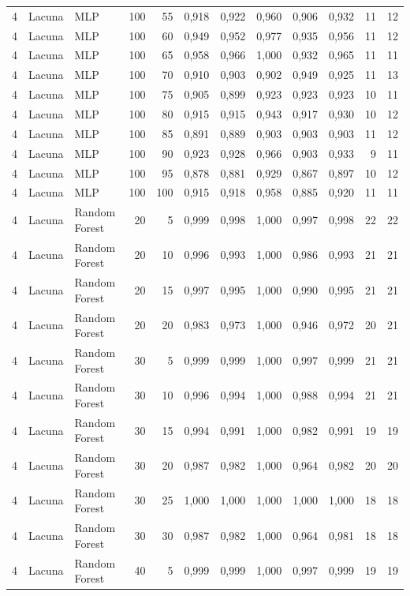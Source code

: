 \begin{longtable}{@{}rllrrrrrrrrr@{}}
4 & Lacuna & MLP & 100 & 55 & 0,918 & 0,922 & 0,960 & 0,906 & 0,932 & 11 & 12 \\
4 & Lacuna & MLP & 100 & 60 & 0,949 & 0,952 & 0,977 & 0,935 & 0,956 & 11 & 12 \\
4 & Lacuna & MLP & 100 & 65 & 0,958 & 0,966 & 1,000 & 0,932 & 0,965 & 11 & 11 \\
4 & Lacuna & MLP & 100 & 70 & 0,910 & 0,903 & 0,902 & 0,949 & 0,925 & 11 & 13 \\
4 & Lacuna & MLP & 100 & 75 & 0,905 & 0,899 & 0,923 & 0,923 & 0,923 & 10 & 11 \\
4 & Lacuna & MLP & 100 & 80 & 0,915 & 0,915 & 0,943 & 0,917 & 0,930 & 10 & 12 \\
4 & Lacuna & MLP & 100 & 85 & 0,891 & 0,889 & 0,903 & 0,903 & 0,903 & 11 & 12 \\
4 & Lacuna & MLP & 100 & 90 & 0,923 & 0,928 & 0,966 & 0,903 & 0,933 & 9 & 11 \\
4 & Lacuna & MLP & 100 & 95 & 0,878 & 0,881 & 0,929 & 0,867 & 0,897 & 10 & 12 \\
4 & Lacuna & MLP & 100 & 100 & 0,915 & 0,918 & 0,958 & 0,885 & 0,920 & 11 & 11 \\
4 & Lacuna & Random Forest & 20 & 5 & 0,999 & 0,998 & 1,000 & 0,997 & 0,998 & 22 & 22 \\
4 & Lacuna & Random Forest & 20 & 10 & 0,996 & 0,993 & 1,000 & 0,986 & 0,993 & 21 & 21 \\
4 & Lacuna & Random Forest & 20 & 15 & 0,997 & 0,995 & 1,000 & 0,990 & 0,995 & 21 & 21 \\
4 & Lacuna & Random Forest & 20 & 20 & 0,983 & 0,973 & 1,000 & 0,946 & 0,972 & 20 & 21 \\
4 & Lacuna & Random Forest & 30 & 5 & 0,999 & 0,999 & 1,000 & 0,997 & 0,999 & 21 & 21 \\
4 & Lacuna & Random Forest & 30 & 10 & 0,996 & 0,994 & 1,000 & 0,988 & 0,994 & 21 & 21 \\
4 & Lacuna & Random Forest & 30 & 15 & 0,994 & 0,991 & 1,000 & 0,982 & 0,991 & 19 & 19 \\
4 & Lacuna & Random Forest & 30 & 20 & 0,987 & 0,982 & 1,000 & 0,964 & 0,982 & 20 & 20 \\
4 & Lacuna & Random Forest & 30 & 25 & 1,000 & 1,000 & 1,000 & 1,000 & 1,000 & 18 & 18 \\
4 & Lacuna & Random Forest & 30 & 30 & 0,987 & 0,982 & 1,000 & 0,964 & 0,981 & 18 & 18 \\
4 & Lacuna & Random Forest & 40 & 5 & 0,999 & 0,999 & 1,000 & 0,997 & 0,999 & 19 & 19 \\

\end{longtable}
